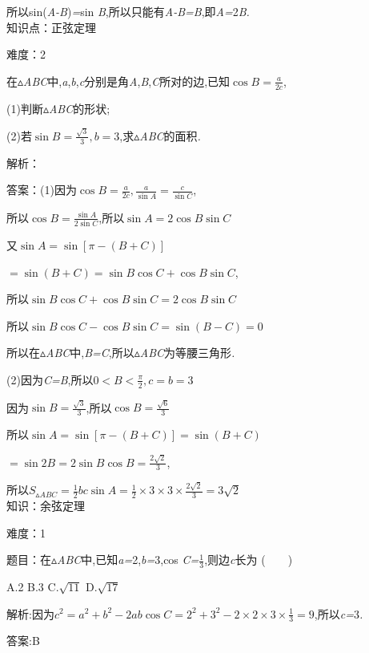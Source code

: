 \documentclass{article} %
\begin{document}
所以sin(\textit{A-B})\textit{=}sin \textit{B},所以只能有\textit{A-B=B},即\textit{A=}2\textit{B.} \\

知识点：正弦定理

难度：2

 在$\mathrm{\vartriangle}$\textit{ABC}中,\textit{a},\textit{b},\textit{c}分别是角\textit{A},\textit{B},\textit{C}所对的边,已知$\cos B=\frac{a}{2c}$,

 (1)判断$\mathrm{\vartriangle}$\textit{ABC}的形状;

 (2)若$\sin B=\frac{\sqrt{3}}{3},b=3$,求$\mathrm{\vartriangle}$\textit{ABC}的面积\textit{.}

解析：

 答案：(1)因为$\cos B=\frac{a}{2c},\frac{a}{\sin A}=\frac{c}{\sin C}$,

所以$\cos B=\frac{\sin A}{2\sin C}$,所以$\sin A=2\cos B\sin C$

又$\sin A=\sin[\pi-(B+C)]$

$=\sin(B+C)=\sin B\cos C+\cos B\sin C$,

所以$\sin B\cos C+\cos B\sin C=2\cos B\sin C$

所以$\sin B\cos C-\cos B\sin C=\sin(B-C)=0$

所以在$\mathrm{\vartriangle}$\textit{ABC}中,\textit{B=C},所以$\mathrm{\vartriangle}$\textit{ABC}为等腰三角形\textit{.}

(2)因为\textit{C=B},所以$0<B<\frac{\pi}{2},c=b=3$

因为$\sin B=\frac{\sqrt{3}}{3}$,所以$\cos B=\frac{\sqrt{6}}{3}$

所以$\sin A=\sin[\pi-(B+C)]=\sin(B+C)$

$=\sin 2B=2\sin B\cos B=\frac{2\sqrt{2}}{3}$,

所以$S_{\vartriangle ABC}=\frac{1}{2}bc\sin A=\frac{1}{2}\times 3\times 3\times \frac{2\sqrt{2}}{3}=3\sqrt{2}$ \\


知识：余弦定理

难度：1

 题目：在$\mathrm{\vartriangle}$\textit{ABC}中,已知\textit{a=}2,\textit{b=}3,cos \textit{C=}$\frac{1}{3}$,则边\textit{c}长为 (\textit{　　})



 A.2 B.3 C.$\sqrt{11}$ D.$\sqrt{17}$

 解析:因为$ c^2=a^2+b^2-2ab\cos C=2^2+3^2-2\times2\times3\times\frac{1}{3}=9$,所以\textit{c=}3\textit{.}

 答案:B
\end{document}
